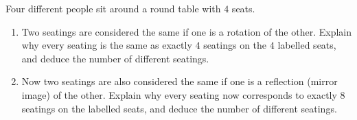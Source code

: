 Four different people sit around a round table with $4$ seats.
\begin{enumerate}
\item[(a)] Two seatings are considered the same if one is a rotation of the other. Explain why every seating is the same as exactly $4$ seatings on the $4$ labelled seats, and deduce the number of different seatings.
\item[(b)] Now two seatings are also considered the same if one is a reflection (mirror image) of the other. Explain why every seating now corresponds to exactly $8$ seatings on the labelled seats, and deduce the number of different seatings.
\end{enumerate}
